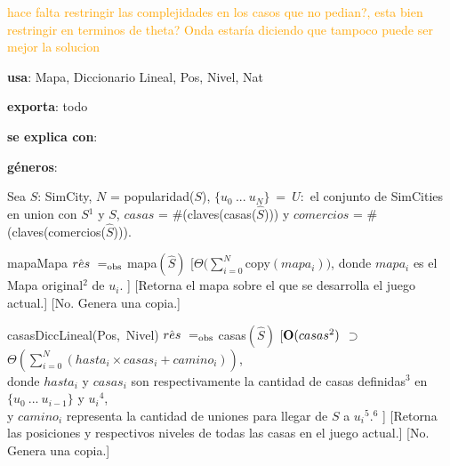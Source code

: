\begin{Interfaz}

    \textcolor{orange}{hace falta restringir las complejidades en los casos que no pedian?,
    esta bien restringir en terminos de theta? Onda estaría diciendo que tampoco puede ser mejor la solucion}

    \textbf{usa}: Mapa, Diccionario Lineal, Pos, Nivel, Nat 
    
    \textbf{exporta}: todo

    \textbf{se explica con}: 
  
    \textbf{géneros}: 
    
    
    Sea $S$: SimCity, $N$ = popularidad($S$), $\{u_0\ ...\ u_{N}\}\ =\ U:$ el conjunto de SimCities en union con $S$$^{1}$ y $S$, \indent
    $casas$ = \#(claves(casas($\hat{S}$))) y $comercios$ = \#(claves(comercios($\hat{S}$))).

    \InterfazFuncion
    {mapa}{}{Mapa}
    {$\hat{res}\ \igobs\ $mapa$(\hat{S})$}
    [$\Theta(\sum_{i = 0}^{N}{}$copy$(mapa_i))$,
        donde $mapa_i$ es el Mapa original$^{2}$ de $u_i$.
    ]
    [Retorna el mapa sobre el que se desarrolla el juego actual.]
    [No. Genera una copia.]

    \InterfazFuncion
    {casas}{}{DiccLineal(Pos,\ Nivel)}
    {$\hat{res}\ \igobs\ $casas$(\hat{S})$}
    [$\bold{O}(casas^{2})$ $\supset$ $\Theta(\sum_{i = 0}^{N}{(hasta_i \times casas_i + camino_i)})$, 
        \\ \tab donde $hasta_i$ y $casas_i$ son respectivamente la cantidad de casas definidas$^{3}$ en $\{u_0\ ...\ u_{i - 1}\}$ y $u_i$$^{4}$, 
        \\ \tab y $camino_i$ representa la cantidad de uniones para llegar de $S$ a $u_i$$^{5}$.$^{6}$
    ]
    [Retorna las posiciones y respectivos niveles de todas las casas en el juego actual.]
    [No. Genera una copia.]


\end{Interfaz}
